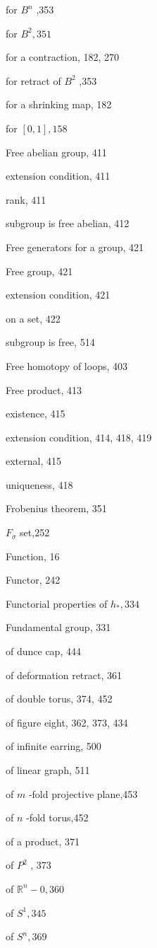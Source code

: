 for \({B}^{n}\) ,353

for \({B}^{2},{351}\)

for a contraction, 182, 270

for retract of \({B}^{2}\) ,353

for a shrinking map, 182

for \(\left\lbrack  {0,1}\right\rbrack  ,{158}\)

Free abelian group, 411

extension condition, 411

rank, 411

subgroup is free abelian, 412

Free generators for a group, 421

Free group, 421

extension condition, 421

on a set, 422

subgroup is free, 514

Free homotopy of loops, 403

Free product, 413

existence, 415

extension condition, 414, 418, 419

external, 415

uniqueness, 418

Frobenius theorem, 351

\({F}_{\sigma }\) set,252

Function, 16

Functor, 242

Functorial properties of \({h}_{ * },{334}\)

Fundamental group, 331

of dunce cap, 444

of deformation retract, 361

of double torus, 374, 452

of figure eight, 362, 373, 434

of infinite earring, 500

of linear graph, 511

of \(m\) -fold projective plane,453

of \(n\) -fold torus,452

of a product, 371

of \({P}^{2}\) , 373

of \({\mathbb{R}}^{n} - 0,{360}\)

of \({S}^{1},{345}\)

of \({S}^{n},{369}\)

